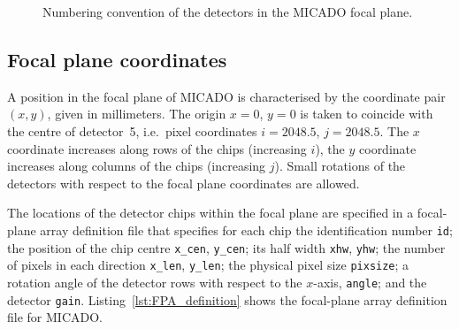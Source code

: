 \documentclass[a4paper,twoside,11pt]{article}
\begin{document}
\begin{figure}[b]
  \centering
  \caption{Numbering convention of the detectors in the MICADO focal
    plane.}
  \label{fig:detector_layout}
\end{figure}

\subsection{Focal plane coordinates}

A position in the focal plane of MICADO is characterised by the
coordinate pair $(x, y)$, given in millimeters. The origin $x=0$,
$y=0$ is taken to coincide with the centre of detector~5, i.e.~pixel
coordinates $i=2048.5$, $j=2048.5$. The $x$ coordinate increases along
rows of the chips (increasing $i$), the $y$ coordinate increases along
columns of the chips (increasing $j$). Small rotations of the
detectors with respect to the focal plane coordinates are allowed.

The locations of the detector chips within the focal plane are
specified in a focal-plane array definition file that specifies for
each chip the identification number \lstinline{id}; the position of
the chip centre \lstinline{x_cen}, \lstinline{y_cen}; its half width
\lstinline{xhw}, \lstinline{yhw}; the number of pixels in each
direction \lstinline{x_len}, \lstinline{y_len}; the physical pixel
size \lstinline{pixsize}; a rotation angle of the detector rows with
respect to the $x$-axis, \lstinline{angle}; and the detector
\lstinline{gain}.  Listing~\ref{lst:FPA_definition} shows the
focal-plane array definition file for MICADO.
\end{document}
